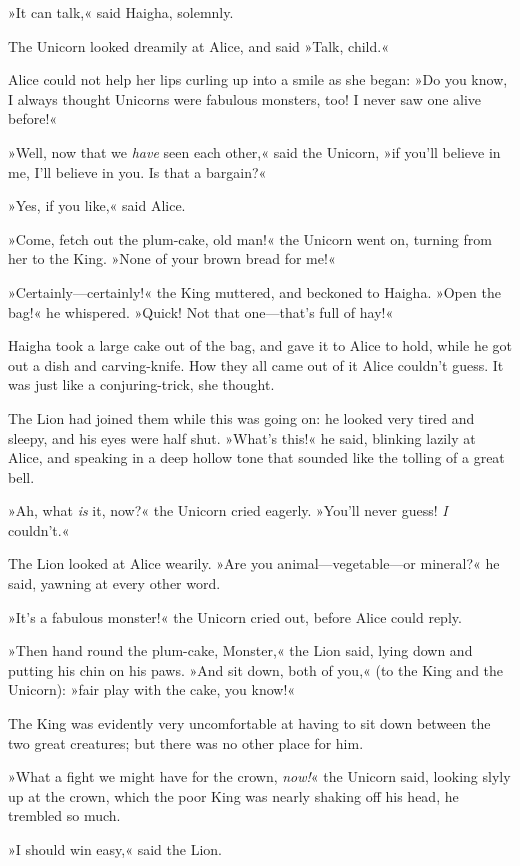 »It can talk,« said Haigha, solemnly.

The Unicorn looked dreamily at Alice, and said »Talk, child.«

Alice could not help her lips curling up into a smile as she began: »Do you know, I always thought Unicorns were fabulous monsters, too! I never saw one alive before!«

»Well, now that we \textit{have} seen each other,« said the Unicorn, »if you'll believe in me, I'll believe in you. Is that a bargain?«

»Yes, if you like,« said Alice.

»Come, fetch out the plum-cake, old man!« the Unicorn went on, turning from her to the King. »None of your brown bread for me!«

»Certainly—certainly!« the King muttered, and beckoned to Haigha. »Open the bag!« he whispered. »Quick! Not that one—that's full of hay!«

Haigha took a large cake out of the bag, and gave it to Alice to hold, while he got out a dish and carving-knife. How they all came out of it Alice couldn't guess. It was just like a conjuring-trick, she thought.

The Lion had joined them while this was going on: he looked very tired and sleepy, and his eyes were half shut. »What's this!« he said, blinking lazily at Alice, and speaking in a deep hollow tone that sounded like the tolling of a great bell.

»Ah, what \textit{is} it, now?« the Unicorn cried eagerly. »You'll never guess! \textit{I} couldn't.«

The Lion looked at Alice wearily. »Are you animal—vegetable—or mineral?« he said, yawning at every other word.

»It's a fabulous monster!« the Unicorn cried out, before Alice could reply.

»Then hand round the plum-cake, Monster,« the Lion said, lying down and putting his chin on his paws. »And sit down, both of you,« (to the King and the Unicorn): »fair play with the cake, you know!«

The King was evidently very uncomfortable at having to sit down between the two great creatures; but there was no other place for him.

»What a fight we might have for the crown, \textit{now!}« the Unicorn said, looking slyly up at the crown, which the poor King was nearly shaking off his head, he trembled so much.

»I should win easy,« said the Lion.

